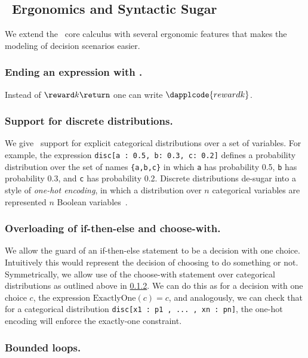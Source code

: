\subsection{\dappl~Ergonomics and Syntactic Sugar}\label{appendix:sugar}
We extend the \dappl~core calculus with several ergonomic features that makes
the modeling of decision scenarios easier.

\subsubsection{Ending an expression with .}

Instead of $\reward k {\return \tt}$ one can write $\dapplcode{reward k}$.

\subsubsection{Support for discrete distributions.}\label{sugar:discrete}

We give \dappl~support for explicit categorical distributions over
a set of variables. For example, the expression \texttt{disc[a : 0.5, b: 0.3, c: 0.2]}
defines a probability distribution over the set of names \texttt{\{a,b,c\}} in which \texttt{a}
has probability 0.5, \texttt{b} has probability 0.3, and \texttt c has probability 0.2.
Discrete distributions de-sugar into a style of \textit{one-hot encoding}, in which a 
distribution over $n$ categorical variables are represented $n$ Boolean variables~\citep{holtzen2020scaling}.

\subsubsection{Overloading of if-then-else and choose-with.}\label{sugar:overloading}

We allow the guard of an if-then-else statement to be a decision with one choice.
Intuitively this would represent the decision of choosing to do something or not.
Symmetrically, we allow use of the choose-with statement over categorical distributions
as outlined above in \ref{sugar:discrete}.
We can do this as for a decision with one choice $c$, 
the expression $\text{ExactlyOne}(c)=c$, and analogously, we can check that for
a categorical distribution \texttt{disc[x1 : p1 , ... , xn : pn]}, the one-hot encoding
will enforce the exactly-one constraint.

\subsubsection{Bounded loops.}\label{sugar:loops}

